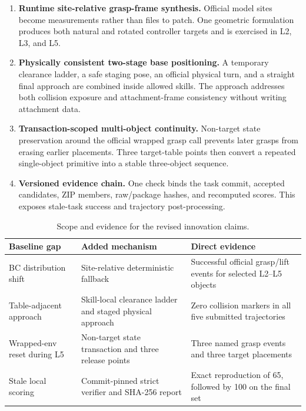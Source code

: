\documentclass[11pt,a4paper]{article}
\begin{document}
\begin{enumerate}
\item \textbf{Runtime site-relative grasp-frame synthesis.} Official model sites become measurements rather than files to patch. One geometric formulation produces both natural and rotated controller targets and is exercised in L2, L3, and L5.
\item \textbf{Physically consistent two-stage base positioning.} A temporary clearance ladder, a safe staging pose, an official physical turn, and a straight final approach are combined inside allowed skills. The approach addresses both collision exposure and attachment-frame consistency without writing attachment data.
\item \textbf{Transaction-scoped multi-object continuity.} Non-target state preservation around the official wrapped grasp call prevents later grasps from erasing earlier placements. Three target-table points then convert a repeated single-object primitive into a stable three-object sequence.
\item \textbf{Versioned evidence chain.} One check binds the task commit, accepted candidates, ZIP members, raw/package hashes, and recomputed scores. This exposes stale-task success and trajectory post-processing.
\end{enumerate}

\begin{table}[H]
\centering
\small
\begin{tabularx}{\textwidth}{p{2.7cm} X X}
\toprule
\textbf{Baseline gap} & \textbf{Added mechanism} & \textbf{Direct evidence} \\
\midrule
BC distribution shift & Site-relative deterministic fallback & Successful official grasp/lift events for selected L2--L5 objects \\
Table-adjacent approach & Skill-local clearance ladder and staged physical approach & Zero collision markers in all five submitted trajectories \\
Wrapped-env reset during L5 & Non-target state transaction and three release points & Three named grasp events and three target placements \\
Stale local scoring & Commit-pinned strict verifier and SHA-256 report & Exact reproduction of 65, followed by 100 on the final set \\
\bottomrule
\end{tabularx}
\caption{Scope and evidence for the revised innovation claims.}
\label{tab:novelty}
\end{table}
\end{document}
